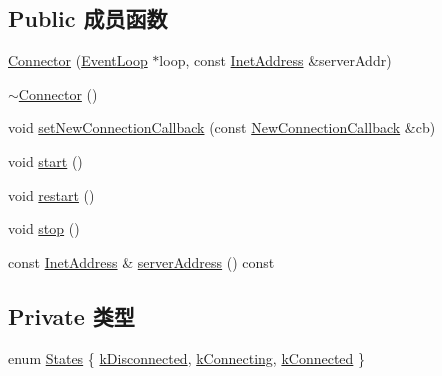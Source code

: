 \subsection*{Public 成员函数}
\begin{DoxyCompactItemize}
\item 
\hyperlink{classmuduo_1_1Connector_a7158c067ded62b1c9e827754c5758a17}{Connector} (\hyperlink{classmuduo_1_1EventLoop}{Event\+Loop} $\ast$loop, const \hyperlink{classmuduo_1_1InetAddress}{Inet\+Address} \&server\+Addr)
\item 
\hyperlink{classmuduo_1_1Connector_a3ee3948f23cf15142798ae0031f6b692}{$\sim$\+Connector} ()
\item 
void \hyperlink{classmuduo_1_1Connector_a30908d8d30b5333e6288a7430d598cb1}{set\+New\+Connection\+Callback} (const \hyperlink{classmuduo_1_1Connector_a74d0c9e28e41cb2b3310e0c1d3671710}{New\+Connection\+Callback} \&cb)
\item 
void \hyperlink{classmuduo_1_1Connector_a60de64d75454385b23995437f1d72669}{start} ()
\item 
void \hyperlink{classmuduo_1_1Connector_a22ee094ca3f45aa4156b97d34fe678bf}{restart} ()
\item 
void \hyperlink{classmuduo_1_1Connector_a8c528baf37154d347366083f0f816846}{stop} ()
\item 
const \hyperlink{classmuduo_1_1InetAddress}{Inet\+Address} \& \hyperlink{classmuduo_1_1Connector_a1d3e517d3d87311eb4cb5d51d5a0ce81}{server\+Address} () const
\end{DoxyCompactItemize}
\subsection*{Private 类型}
\begin{DoxyCompactItemize}
\item 
enum \hyperlink{classmuduo_1_1Connector_a808e5cd4979462d3bbe3070d7d147444}{States} \{ \hyperlink{classmuduo_1_1Connector_a808e5cd4979462d3bbe3070d7d147444a5f4e8711c6f39bc392c23dfacf44c953}{k\+Disconnected}, 
\hyperlink{classmuduo_1_1Connector_a808e5cd4979462d3bbe3070d7d147444adddfdd7363e62a5f443716e15d0bc1ff}{k\+Connecting}, 
\hyperlink{classmuduo_1_1Connector_a808e5cd4979462d3bbe3070d7d147444acb7fe9fd788a796e7d827c0303dcd405}{k\+Connected}
 \}
\end{DoxyCompactItemize}

